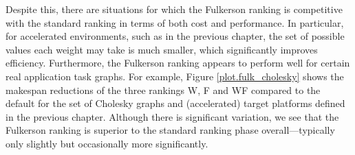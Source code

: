 \documentclass[12pt]{article}
\begin{document}
Despite this, there are situations for which the Fulkerson ranking is competitive with the standard ranking in terms of both cost and performance. In particular, for accelerated environments, such as in the previous chapter, the set of possible values each weight may take is much smaller, which significantly improves efficiency. Furthermore, the Fulkerson ranking appears to perform well for certain real application task graphs. For example, Figure \ref{plot.fulk_cholesky} shows the makespan reductions of the three rankings W, F and WF compared to the default for the set of Cholesky graphs and (accelerated) target platforms defined in the previous chapter. Although there is significant variation, we see that the Fulkerson ranking is superior to the standard ranking phase overall---typically only slightly but occasionally more significantly.   
\end{document}
